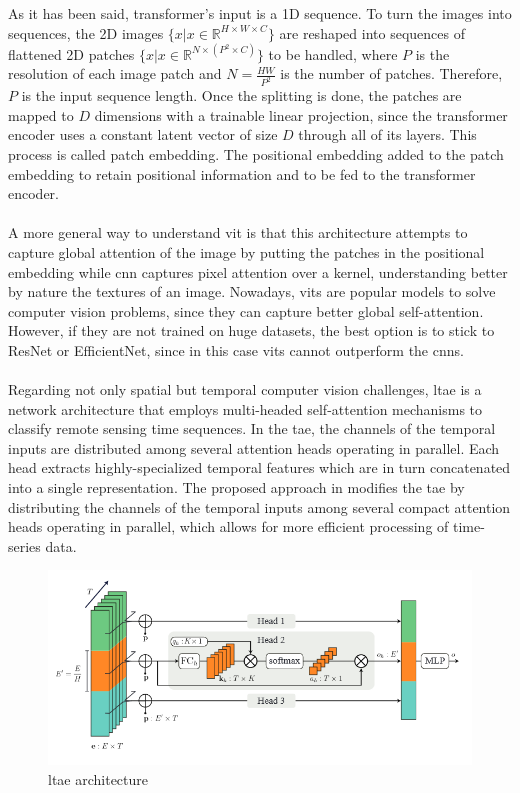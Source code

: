 \documentclass[../main.tex]{subfiles}
\begin{document}
As it has been said, transformer's input is a 1D sequence. To turn the images into sequences, the 2D images $\{x | x \in \mathbb{R} ^{H \times W \times C}\}$ are reshaped into sequences of flattened 2D patches $\{x | x \in \mathbb{R}^{N \times (P^2 \times C)}\}$ to be handled, where $P$ is the resolution of each image patch and $N = \frac{HW}{P^2} $ is the number of patches. Therefore, $P$ is the input sequence length.
Once the splitting is done, the patches are mapped to $D$ dimensions with a trainable linear projection, since the transformer encoder uses a constant latent vector of size $D$ through all of its layers. This process is called patch embedding. The positional embedding added to the patch embedding to retain positional information and to be fed to the transformer encoder.
\\\\
A more general way to understand \gls{vit} is that this architecture attempts to capture global attention of the image by putting the patches in the positional embedding while \gls{cnn} captures pixel attention over a kernel, understanding better by nature the textures of an image. Nowadays, \gls{vit}s are popular models to solve computer vision problems, since they can capture better global self-attention. However, if they are not trained on huge datasets, the best option is to stick to ResNet or EfficientNet, since in this case \gls{vit}s cannot outperform the \gls{cnn}s.
\\\\
Regarding not only spatial but temporal computer vision challenges, \gls{ltae} is a network architecture that employs multi-headed self-attention mechanisms to classify remote sensing time sequences. In the \gls{tae}, the channels of the temporal inputs are distributed among several attention heads operating in parallel. Each head extracts highly-specialized temporal features which are in turn concatenated into a single representation. The proposed approach in \cite{garnot2021lightweight} modifies the \gls{tae} by distributing the channels of the temporal inputs among several compact attention heads operating in parallel, which allows for more efficient processing of time-series data.
\begin{figure}[H]
	\centering
	\includegraphics[width=12cm]{imgs/relatedwork/ltae}
	\caption{\gls{ltae} architecture}
\end{figure}
\end{document}
